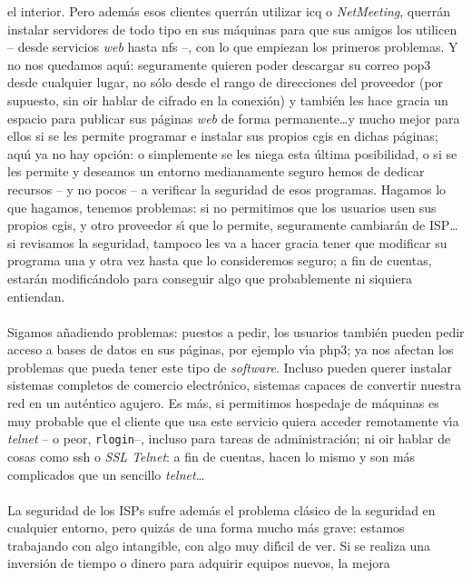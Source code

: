 el interior. Pero adem\'as esos clientes querr\'an utilizar {\sc icq} o {\it
NetMeeting}, querr\'an instalar servidores de todo tipo en sus m\'aquinas para
que sus amigos los utilicen -- desde servicios {\it web} hasta {\sc nfs} --, con
lo que empiezan los primeros problemas. Y no nos quedamos aqu\'{\i}: seguramente
quieren poder descargar su correo {\sc pop3} desde cualquier lugar, no s\'olo
desde el rango de direcciones del proveedor (por supuesto, sin oir hablar de 
cifrado en la conexi\'on) y tambi\'en les hace gracia un espacio para publicar
sus p\'aginas {\it web} de forma permanente\ldots y mucho mejor para ellos si
se les permite programar e instalar sus propios {\sc cgi}s en dichas p\'aginas;
aqu\'{\i} ya no hay opci\'on: o simplemente se les niega esta \'ultima 
posibilidad, o si se les permite y deseamos un entorno medianamente seguro hemos
de dedicar recursos -- y no pocos -- a verificar la seguridad de esos programas.
Hagamos lo que hagamos, tenemos problemas: si no permitimos que los usuarios
usen sus propios {\sc cgi}s, y otro proveedor s\'{\i} que lo permite, 
seguramente cambiar\'an de ISP\ldots si revisamos la seguridad, tampoco les va
a hacer gracia tener que modificar su programa una y otra vez hasta que lo
consideremos seguro; a fin de cuentas, estar\'an modific\'andolo para conseguir
algo que probablemente ni siquiera entiendan.\\
\\Sigamos a\~nadiendo problemas: puestos a pedir, los usuarios tambi\'en pueden
pedir acceso a bases de datos en sus p\'aginas, por ejemplo v\'{\i}a {\sc php3};
ya nos afectan los problemas que pueda tener este tipo de {\it software}. 
Incluso pueden querer instalar sistemas completos de comercio electr\'onico, 
sistemas capaces de convertir nuestra red en un aut\'entico agujero. Es m\'as,
si permitimos hospedaje de m\'aquinas es muy probable que el cliente que
usa este servicio quiera acceder remotamente v\'{\i}a {\it telnet} -- o peor,
{\tt rlogin}--, incluso para tareas de administraci\'on; ni oir hablar de 
cosas como {\sc ssh} o {\it SSL Telnet}: a fin de cuentas, hacen lo mismo y son
m\'as complicados que un sencillo {\it telnet}\ldots\\
\\La seguridad de los ISPs sufre adem\'as el problema cl\'asico de la seguridad 
en cualquier entorno, pero quiz\'as de una forma mucho m\'as grave: estamos 
trabajando con algo intangible, con algo muy dif\'{\i}cil de ver. Si se realiza
una inversi\'on de tiempo o dinero para adquirir equipos nuevos, la mejora 
